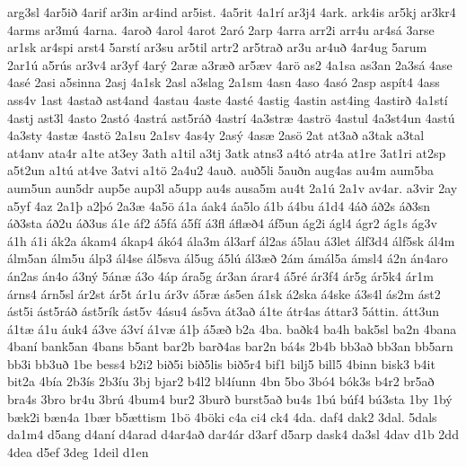 {arg3sl
4ar5i^^f0
4arif
ar3in
ar4ind
ar5ist.
4a5rit
4a1r^^ed
ar3j4
4ark.
ark4is
ar5kj
ar3kr4
4arms
ar3m^^fa
4arna.
4aro^^f0
4arol
4arot
2ar^^f3
2arp
4arra
arr2i
arr4u
ar4s^^e1
3arse
ar1sk
ar4spi
arst4
5arst^^ed
ar3su
ar5til
artr2
ar5tra^^f0
ar3u
ar4u^^f0
4ar4ug
5arum
2ar1^^fa
a5r^^fas
ar3v4
ar3yf
4ar^^fd
2ar^^e6
a3r^^e6^^f0
ar5^^e6v
4ar^^f6
as2
4a1sa
as3an
2a3s^^e1
4ase
4as^^e9
2asi
a5sinna
2asj
4a1sk
2asl
a3slag
2a1sm
4asn
4aso
4as^^f3
2asp
asp^^edt4
4ass
ass4v
1ast
4asta^^f0
ast4and
4astau
4aste
4ast^^e9
4astig
4astin
ast4ing
4astir^^f0
4a1st^^ed
4astj
ast3l
4asto
2ast^^f3
4astr^^e1
ast5r^^e1^^f0
4astr^^ed
4a3str^^e6
4astr^^f6
4astul
4a3st4un
4ast^^fa
4a3sty
4ast^^e6
4ast^^f6
2a1su
2a1sv
4as4y
2as^^fd
4as^^e6
2as^^f6
2at
at3a^^f0
a3tak
a3tal
at4anv
ata4r
a1te
at3ey
3ath
a1til
a3tj
3atk
atns3
a4t^^f3
atr4a
at1re
3at1ri
at2sp
a5t2un
a1t^^fa
at4ve
3atvi
a1t^^f6
2a4u2
4au^^f0.
au^^f05li
5au^^f0n
aug4as
au4m
aum5ba
aum5un
aun5dr
aup5e
aup3l
a5upp
au4s
ausa5m
au4t
2a1^^fa
2a1v
av4ar.
a3vir
2ay
a5yf
4az
2a1^^fe
a2^^fe^^f3
2a3^^e6
4a5^^f6
^^e11a
^^e1ak4
^^e1a5lo
^^e11b
^^e14bu
^^e11d4
4^^e1^^f0
^^e1^^f02s
^^e1^^f03sn
^^e1^^f03sta
^^e1^^f02u
^^e1^^f03us
^^e11e
^^e1f2
^^e15f^^e1
^^e15f^^ed
^^e13fl
^^e1fl^^e6^^f04
^^e1f5un
^^e1g2i
^^e1gl4
^^e1gr2
^^e1g1s
^^e1g3v
^^e11h
^^e11i
^^e1k2a
^^e1kam4
^^e1kap4
^^e1k^^f34
^^e1la3m
^^e1l3arf
^^e1l2as
^^e15lau
^^e13let
^^e1lf3d4
^^e1lf5sk
^^e1l4m
^^e1lm5an
^^e1lm5u
^^e1lp3
^^e1l4se
^^e1l5sva
^^e1l5ug
^^e15l^^fa
^^e1l3^^e6^^f0
2^^e1m
^^e1m^^e1l5a
^^e1msl4
^^e12n
^^e1n4aro
^^e1n2as
^^e1n4o
^^e13n^^fd
5^^e1n^^e6
^^e13o
4^^e1p
^^e1ra5g
^^e1r3an
^^e1rar4
^^e15r^^e9
^^e1r3f4
^^e1r5g
^^e1r5k4
^^e1r1m
^^e1rns4
^^e1rn5sl
^^e1r2st
^^e1r5t
^^e1r1u
^^e1r3v
^^e15r^^e6
^^e1s5en
^^e11sk
^^e12ska
^^e14ske
^^e13s4l
^^e1s2m
^^e1st2
^^e1st5i
^^e1st5r^^e1^^f0
^^e1st5r^^edk
^^e1st5v
4^^e1su4
^^e1s5va
^^e1t3a^^f0
^^e11te
^^e1tr4as
^^e1ttar3
5^^e1ttin.
^^e1tt3un
^^e11t^^e6
^^e11u
^^e1uk4
^^e13ve
^^e13v^^ed
^^e11v^^e6
^^e11^^fe
^^e15^^e6^^f0
b2a
4ba.
ba^^f0k4
ba4h
bak5sl
ba2n
4bana
4ban^^ed
bank5an
4bans
b5ant
bar2b
bar^^f04as
bar2n
b^^e14s
2b4b
bb3a^^f0
bb3an
bb5arn
bb3i
bb3u^^f0
1be
bess4
b2i2
bi^^f05i
bi^^f05lis
bi^^f05r4
bif1
bilj5
bill5
4binn
bisk3
b4it
bit2a
4b^^eda
2b3^^eds
2b3^^edu
3bj
bjar2
b4l2
bl4^^edunn
4bn
5bo
3b^^f34
b^^f3k3s
b4r2
br5a^^f0
bra4s
3bro
br4u
3br^^fa
4bum4
bur2
3bur^^f0
burst5a^^f0
bu4s
1b^^fa
b^^faf4
b^^fa3sta
1by
1b^^fd
b^^e6k2i
b^^e6n4a
1b^^e6r
b5^^e6ttism
1b^^f6
4b^^f6ki
c4a
ci4
ck4
4da.
daf4
dak2
3dal.
5dals
da1m4
d5ang
d4an^^ed
d4arad
d4ar4a^^f0
dar4^^e1r
d3arf
d5arp
dask4
da3sl
4dav
d1b
2dd
4dea
d5ef
3deg
1deil
d1en
}

